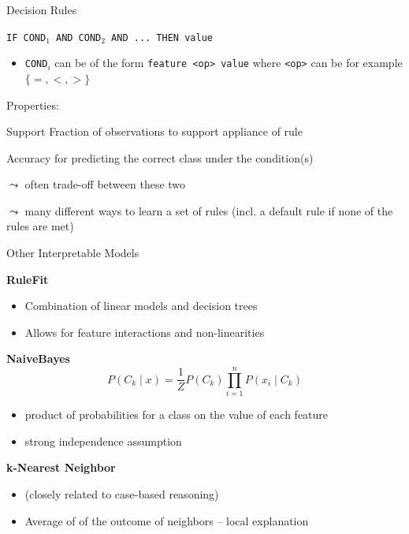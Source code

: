 \documentclass[11pt,compress,t,notes=noshow, aspectratio=169, xcolor=table]{beamer}
\begin{document}

\begin{frame}[c]{Decision Rules}

\texttt{IF COND$_1$ AND COND$_2$ AND ... THEN value}

\begin{itemize}
    \item \texttt{COND$_i$} can be of the form \texttt{feature <op> value} where \texttt{<op>} can be for example $\{=, <, > \}$
\end{itemize}

\pause
\medskip

Properties:
\begin{description}
    \item{Support} Fraction of observations to support appliance of rule
    \item{Accuracy} for predicting the correct class under the condition(s)
\end{description}

$\leadsto$ often trade-off between these two

\pause
\medskip

$\leadsto$ many different ways to learn a set of rules (incl. a default rule if none of the rules are met)

\end{frame}


\begin{frame}[c]{Other Interpretable Models}

\textbf{RuleFit} 
\begin{itemize}
    \item Combination of linear models and decision trees 
    \item Allows for feature interactions and non-linearities
\end{itemize}

\textbf{NaiveBayes}
$$P (C_k \mid x ) = \frac{1}{Z} P(C_k) \prod_{i=1}^{n} P(x_i \mid C_k) $$
\begin{itemize}
    \item product of probabilities for a class on the value of each feature
    \item strong independence assumption
\end{itemize}


\textbf{k-Nearest Neighbor}
\begin{itemize}
    \item (closely related to case-based reasoning)
    \item Average of of the outcome of neighbors -- local explanation
\end{itemize}

\end{frame}


\endlecture
\end{document}

